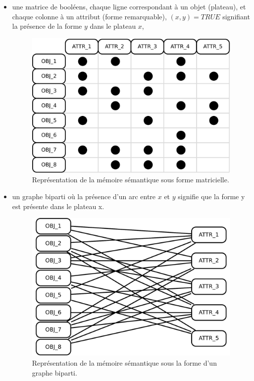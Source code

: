 \begin{itemize}
\item une matrice de booléens, chaque ligne correspondant à un objet (plateau), et chaque colonne à un attribut (forme remarquable), $(x,y)=TRUE$ signifiant la présence de la forme $y$ dans le plateau $x$,
\begin{figure}[H]
\includegraphics[width=\textwidth]{files/memoire/context_matrix}
\caption{Représentation de la mémoire sémantique sous forme matricielle.}
\end{figure}


\item un graphe biparti où la présence d'un arc entre $x$ et $y$ signifie que la forme y est présente dans le plateau x.
\begin{figure}[H]
\includegraphics[width=\textwidth]{files/memoire/context_graph}
\caption{Représentation de la mémoire sémantique sous la forme d'un graphe biparti.}
\end{figure}
\end{itemize}